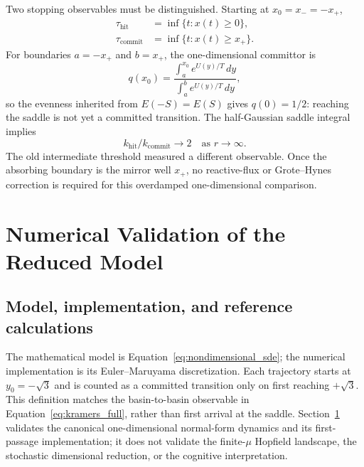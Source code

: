 \documentclass[a4paper,twocolumn,10pt]{article}
\begin{document}
Two stopping observables must be distinguished. Starting at $x_0=x_-=-x_+$,
\begin{equation}
\begin{aligned}
\tau_{\mathrm{hit}}&=\inf\{t:x(t)\geq0\},\\
\tau_{\mathrm{commit}}&=\inf\{t:x(t)\geq x_+\}.
\end{aligned}
\label{eq:hit_commit}
\end{equation}
For boundaries $a=-x_+$ and $b=x_+$, the one-dimensional committor is
\begin{equation}
q(x_0)=\frac{\int_a^{x_0}e^{U(y)/T}\,dy}{\int_a^b e^{U(y)/T}\,dy},
\label{eq:committor}
\end{equation}
so the evenness inherited from $E(-S)=E(S)$ gives $q(0)=1/2$: reaching the saddle is not yet a committed transition. The
half-Gaussian saddle integral implies
\begin{equation}
k_{\mathrm{hit}}/k_{\mathrm{commit}}\longrightarrow2
\quad\text{as }r\to\infty.
\label{eq:hit_commit_ratio}
\end{equation}
The old intermediate threshold measured a different observable. Once the absorbing boundary is the
mirror well $x_+$, no reactive-flux or Grote--Hynes correction is required for this overdamped
one-dimensional comparison.

\section{Numerical Validation of the Reduced Model}
\label{sec:simulation}

\subsection{Model, implementation, and reference calculations}

The mathematical model is Equation~\eqref{eq:nondimensional_sde}; the numerical implementation is
its Euler--Maruyama discretization. Each trajectory starts at $y_0=-\sqrt3$ and is counted as a
committed transition only on first reaching $+\sqrt3$. This definition matches the basin-to-basin
observable in Equation~\eqref{eq:kramers_full}, rather than first arrival at the saddle.
Section~\ref{sec:simulation} validates the canonical one-dimensional normal-form dynamics and its
first-passage implementation; it does not validate the finite-$\mu$ Hopfield landscape, the
stochastic dimensional reduction, or the cognitive interpretation.
\end{document}
